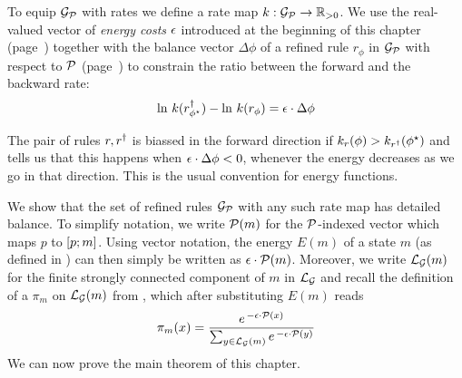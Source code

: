 To equip $\mathcal{G}_{\mathcal{P}}$ with rates
we define a rate map $k: \mathcal{G}_{\mathcal{P}} \to \mathbb{R}_{>0}$.
We use the real-valued vector of \emph{energy costs} $\epsilon$
introduced at the beginning of this chapter
(page~\pageref{chp:direct})
together with the balance vector $\Delta\phi$
of a refined rule $r_\phi$ in $\mathcal{G}_{\mathcal{P}}$
with respect to $\mathcal{P}$
(page~\pageref{p:balance-vector})
to constrain the ratio
between the forward and the backward rate:
\begin{equation}
  \label{eq:rates}
  \ln\, {k(r^\dagger_{\phi^\star})} - \ln\, {k(r_\phi)} =
  \epsilon \cdot \Delta\phi
\end{equation}

The pair of rules $r,r^\dagger$ is biassed in the forward direction
if $k_r(\phi) > k_{r^\dagger}(\phi^\star)$
and  tells us that this happens
when $\epsilon \cdot \Delta\phi < 0$,
\ie whenever the energy decreases as we go in that direction.
This is the usual convention for energy functions.

We show that the set of refined rules $\mathcal{G}_{\mathcal{P}}$
with any such rate map
has detailed balance.
To simplify notation,
we write $\mathcal{P}(m)$
for the $\mathcal{P}$-indexed vector
which maps $p$ to $\left[p;m\right]$.
Using vector notation,
the energy $E(m)$ of a state $m$
(as defined in )
can then simply be written as $\epsilon \cdot \mathcal{P}(m)$.
Moreover, we write $\mathcal{L}_{\mathcal{G}}(m)$ for the finite
strongly connected component of $m$ in $\mathcal{L}_{\mathcal{G}}$
and recall the definition of a \pmf
$\pi_m$ on $\mathcal{L}_{\mathcal{G}}(m)$ from ,
which after substituting $E(m)$ reads
\begin{equation}
  \label{eq:boltzmann}
  \pi_m(x) = \dfrac{
    e^{\,-\epsilon \cdot \mathcal{P}(x)}}{
    \sum_{y \in \mathcal{L}_{\mathcal{G}}(m)} e^{\,-\epsilon \cdot \mathcal{P}(y)}}
\end{equation}
%
We can now prove the main theorem of this chapter.

